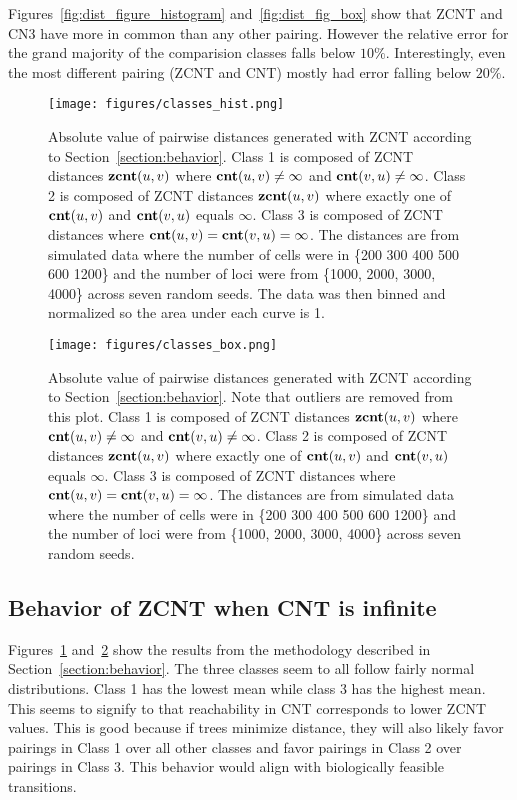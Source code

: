Figures~\ref{fig:dist_figure_histogram} and~\ref{fig:dist_fig_box} show that ZCNT and CN3 have more in common than any other pairing. However the relative error for the grand majority of the comparision classes falls below $10\%$. Interestingly, even the most different pairing (ZCNT and CNT) mostly had error falling below $20\%$. 

\begin{figure}[ht]
    \centering
    \texttt{[image: figures/classes\_hist.png]}
    \caption{Absolute value of pairwise distances generated with ZCNT according to Section~\ref{section:behavior}. Class 1 is composed of ZCNT distances $\textbf{zcnt}(u, v)$ where $\textbf{cnt}(u, v) \neq \infty$ and $\textbf{cnt}(v, u) \neq \infty$. Class 2 is composed of ZCNT distances $\textbf{zcnt}(u, v)$ where exactly one of $\textbf{cnt}(u, v)$ and $\textbf{cnt}(v, u)$ equals $\infty$. Class 3 is composed of ZCNT distances where $\textbf{cnt}(u, v) = \textbf{cnt}(v, u) = \infty$. The distances are from simulated data where the number of cells were in \{200 300 400 500 600 1200\} and the number of loci were from \{1000, 2000, 3000, 4000\} across seven random seeds. The data was then binned and normalized so the area under each curve is 1.}\label{fig:classes_hist}
\end{figure}

\begin{figure}[ht]
    \centering
    \texttt{[image: figures/classes\_box.png]}
    \caption{Absolute value of pairwise distances generated with ZCNT according to Section~\ref{section:behavior}. Note that outliers are removed from this plot. Class 1 is composed of ZCNT distances $\textbf{zcnt}(u, v)$ where $\textbf{cnt}(u, v) \neq \infty$ and $\textbf{cnt}(v, u) \neq \infty$. Class 2 is composed of ZCNT distances $\textbf{zcnt}(u, v)$ where exactly one of $\textbf{cnt}(u, v)$ and $\textbf{cnt}(v, u)$ equals $\infty$. Class 3 is composed of ZCNT distances where $\textbf{cnt}(u, v) = \textbf{cnt}(v, u) = \infty$. The distances are from simulated data where the number of cells were in \{200 300 400 500 600 1200\} and the number of loci were from \{1000, 2000, 3000, 4000\} across seven random seeds.}\label{fig:classes_box}
\end{figure}

\subsection{Behavior of ZCNT when CNT is infinite}\label{section:behavior_res}

Figures~\ref{fig:classes_hist} and~\ref{fig:classes_box} show the results from the methodology described in Section~\ref{section:behavior}. The three classes seem to all follow fairly normal distributions. Class 1 has the lowest mean while class 3 has the highest mean. This seems to signify to that reachability in CNT corresponds to lower ZCNT values. This is good because if trees minimize distance, they will also likely favor pairings in Class 1 over all other classes and favor pairings in Class 2 over pairings in Class 3. This behavior would align with biologically feasible transitions. 

